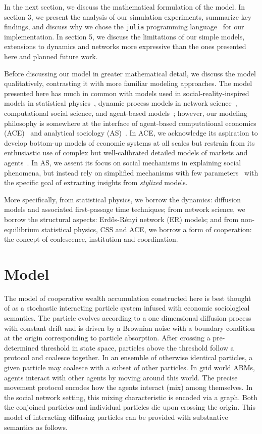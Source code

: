 \documentclass[sigconf]{acmart}
\begin{document}
In the next section, we discuss the mathematical formulation of the model. In section 3, we present the analysis of our simulation experiments, summarize key findings, and discuss why we chose the \texttt{julia} programming language~\cite{Julia-2017} for our implementation. In section 5, we discuss the limitations of our simple models, extensions to dynamics and networks more expressive than the ones presented here and planned future work. 

Before discussing our model in greater mathematical detail, we discuss the model qualitatively, contrasting it with more familiar modeling approaches. The model presented here has much in common with models used in social-reality-inspired models in statistical physics~\cite{redner2001guide}, dynamic process models in network science~\cite{newman2018networks}, computational social science, and agent-based models~\cite{abm_review}; however, our modeling philosophy is somewhere at the interface of agent-based computational economics (ACE)~\cite{tesfatsion} and analytical sociology (AS)~\cite{ch1as_hdbk,ch2as_hdbk}. In ACE, we acknowledge its aspiration to develop bottom-up models of economic systems at all scales but restrain from its enthusiastic use of complex but well-calibrated detailed models of markets and agents~\cite{tesfatsion2017}. In AS, we assent its focus on social mechanisms in explaining social phenomena, but instead rely on simplified mechanisms with few parameters~\cite{ch11as_hdbk} with the specific goal of extracting insights from \textit{stylized} models.       

More specifically, from statistical physics, we borrow the dynamics: diffusion models and associated first-passage time techniques; from network science, we borrow the structural aspects: Erd\H{o}s-R\'{e}nyi network (ER) models; and from non-equilibrium statistical physics, CSS and ACE, we borrow a form of cooperation: the concept of coalescence, institution and coordination. 


\section{Model}
The model of cooperative wealth accumulation constructed here is best thought of as a stochastic interacting particle system infused with economic sociological semantics. The particle evolves according to a one dimensional diffusion process with constant drift and is driven by a Brownian noise with a boundary condition at the origin corresponding to particle absorption. After crossing a pre-determined threshold in state space, particles above the threshold follow a protocol and coalesce together. In an ensemble of otherwise identical particles, a given particle may coalesce with a subset of other particles. In grid world ABMs, agents interact with other agents by moving around this world. The precise movement protocol encodes how the agents interact (mix) among themselves. In the social network setting, this mixing characteristic is encoded via a graph. Both the conjoined particles and individual particles die upon crossing the origin. This model of interacting diffusing particles can be provided with substantive semantics as follows. 
\end{document}
